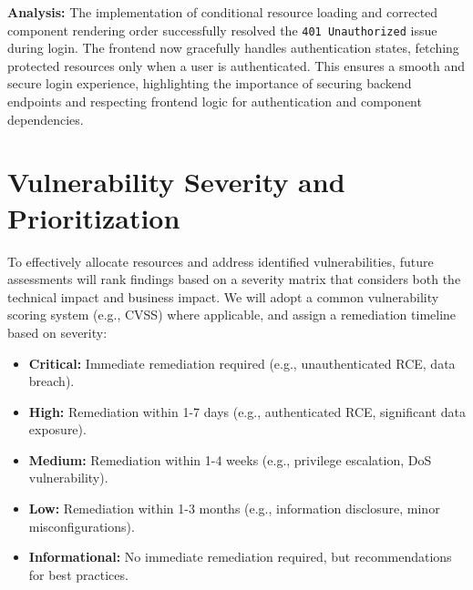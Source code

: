 \documentclass{article}
\begin{document}
\textbf{Analysis:}
The implementation of conditional resource loading and corrected component rendering order successfully resolved the \texttt{401 Unauthorized} issue during login. The frontend now gracefully handles authentication states, fetching protected resources only when a user is authenticated. This ensures a smooth and secure login experience, highlighting the importance of securing backend endpoints and respecting frontend logic for authentication and component dependencies.

\section{Vulnerability Severity and Prioritization}
To effectively allocate resources and address identified vulnerabilities, future assessments will rank findings based on a severity matrix that considers both the technical impact and business impact. We will adopt a common vulnerability scoring system (e.g., CVSS) where applicable, and assign a remediation timeline based on severity:
\begin{itemize}
    \item \textbf{Critical:} Immediate remediation required (e.g., unauthenticated RCE, data breach).
    \item \textbf{High:} Remediation within 1-7 days (e.g., authenticated RCE, significant data exposure).
    \item \textbf{Medium:} Remediation within 1-4 weeks (e.g., privilege escalation, DoS vulnerability).
    \item \textbf{Low:} Remediation within 1-3 months (e.g., information disclosure, minor misconfigurations).
    \item \textbf{Informational:} No immediate remediation required, but recommendations for best practices.
\end{itemize}
\end{document}
